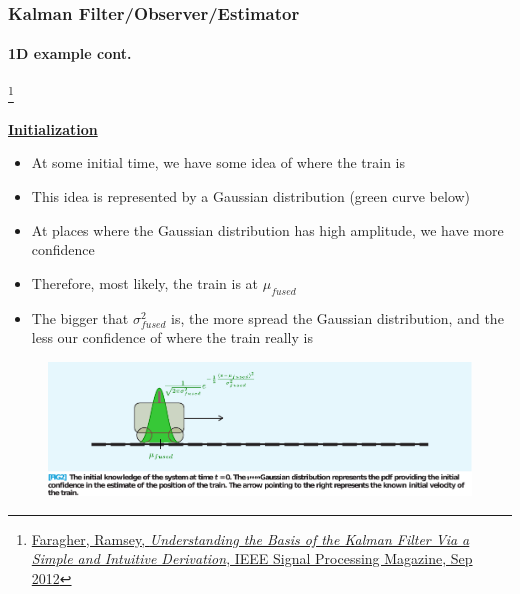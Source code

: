 %





\begin{frame}[plain]
\frametitle{Kalman Filter/Observer/Estimator}
\framesubtitle{1D example \tiny cont.}

\footnote{\tiny\hspace{-0.23in} \href{http://www.cl.cam.ac.uk/~rmf25/papers/Understanding the Basis of the Kalman Filter.pdf}{Faragher, Ramsey, \emph{Understanding the Basis of the Kalman Filter Via a Simple and Intuitive Derivation}, IEEE Signal Processing Magazine, Sep 2012}}
\scriptsize
\begin{changemargin}{-1.3in}{0in}
\underline{\textbf{Initialization}}
\begin{itemize}\scriptsize
\item At some initial time, we have some idea of where the train is
\item This idea is represented by a Gaussian distribution (green curve below)
\item At places where the Gaussian distribution has high amplitude, we have more confidence
\item Therefore, most likely, the train is at $\mu_{fused}$
\item The bigger that $\sigma_{fused}^2$ is, the more spread the Gaussian distribution, and the less our confidence of where the train really is
\end{itemize}
\begin{figure}[h]
\centering
\includegraphics[width=1.35\textwidth]{figs/2012_MAG_Understanding_the_Basis_of_the_Kalman_Filter_fig2_mine.pdf}
\end{figure}
\end{changemargin}
\end{frame}


